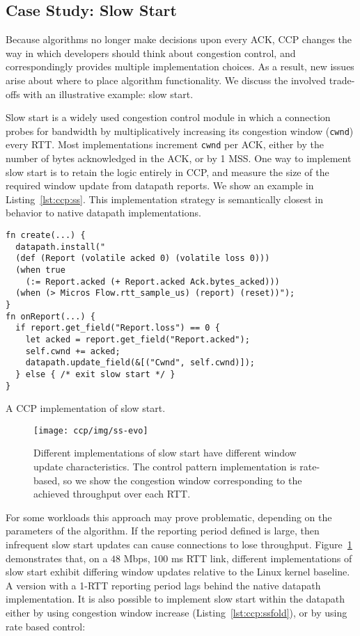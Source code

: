 \subsection{Case Study: Slow Start}
\label{s:ccp:ss}

Because algorithms no longer make decisions upon every ACK, CCP changes the way in which developers should think about congestion control, and correspondingly provides multiple implementation choices. As a result, new issues arise about where to place algorithm functionality. We discuss the involved trade-offs with an illustrative example: slow start.

Slow start is a widely used congestion control module in which a connection probes for bandwidth by multiplicatively increasing its congestion window (\texttt{cwnd}) every RTT. Most implementations increment \texttt{cwnd} per ACK, either by the number of bytes acknowledged in the ACK, or by 1 MSS. One way to implement slow start is to retain the logic entirely in CCP, and measure the size of the required window update from datapath reports. We show an example in Listing~\ref{lst:ccp:ss}. This implementation strategy is semantically closest in behavior to native datapath implementations.

\begin{listing}
{\footnotesize
\begin{verbatim}
fn create(...) {
  datapath.install("
  (def (Report (volatile acked 0) (volatile loss 0)))
  (when true 
    (:= Report.acked (+ Report.acked Ack.bytes_acked)))
  (when (> Micros Flow.rtt_sample_us) (report) (reset))");
}
fn onReport(...) {
  if report.get_field("Report.loss") == 0 {
    let acked = report.get_field("Report.acked");
    self.cwnd += acked;
    datapath.update_field(&[("Cwnd", self.cwnd)]);
  } else { /* exit slow start */ }
}
\end{verbatim}
}
\caption{A CCP implementation of slow start.} \label{lst:ccp:ss}
\end{listing}

\begin{figure}
    \centering
    \texttt{[image: ccp/img/ss-evo]}
    \caption{Different implementations of slow start have different window update characteristics. The control pattern implementation is rate-based, so we show the congestion window corresponding to the achieved throughput over each RTT.}
    \label{fig:ccp:ss}
\end{figure}

For some workloads this approach may prove problematic, depending on the parameters of the algorithm. If the reporting period defined is large, then infrequent slow start updates can cause connections to lose throughput.
Figure~\ref{fig:ccp:ss} demonstrates that, on a $48$ Mbps, $100$ ms RTT link, different implementations of slow start exhibit differing window updates relative to the Linux kernel baseline.
A version with a 1-RTT reporting period lags behind the native datapath implementation. It is also possible to implement slow start within the datapath either by using congestion window increase (Listing~\ref{lst:ccp:ssfold}), or by using rate based control: 

